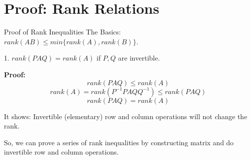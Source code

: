 \documentclass{beamer}
\begin{document}
\section{Proof: Rank Relations}
\begin{frame}{Proof of Rank Inequalities}
The Basics: $rank(AB) \leqslant min\{rank(A),rank(B)\}$.

\vspace{5pt}
1. $rank(PAQ)=rank(A)$ if $P,Q$ are invertible.

\vspace{5pt}
\textbf{Proof:}
\begin{equation*}
    rank(PAQ)\leqslant rank(A)
\end{equation*}
\begin{equation*}
    rank(A)=rank(P^{-1}PAQQ^{-1}) \leqslant rank(PAQ)
\end{equation*}
\begin{equation*}
    rank(PAQ)=rank(A)
\end{equation*}

It shows: Invertible (elementary) row and column operations will not change the rank.

\vspace{3pt}
So, we can prove a series of rank inequalities by constructing matrix and do invertible row and column operations.
\end{frame}
\end{document}
